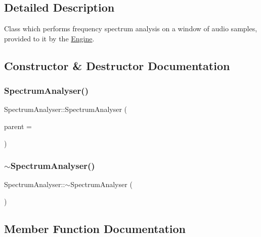 \subsection{Detailed Description}
Class which performs frequency spectrum analysis on a window of audio samples, provided to it by the \hyperlink{class_engine}{Engine}. 

\subsection{Constructor \& Destructor Documentation}
\hypertarget{class_spectrum_analyser_abf706ac78327bc590b90b586086c0cd5}{}\label{class_spectrum_analyser_abf706ac78327bc590b90b586086c0cd5} 
\subsubsection{\texorpdfstring{Spectrum\+Analyser()}{SpectrumAnalyser()}}
{\footnotesize\ttfamily Spectrum\+Analyser\+::\+Spectrum\+Analyser (\begin{DoxyParamCaption}\item[{Q\+Object $\ast$}]{parent = {} }\end{DoxyParamCaption})}

\hypertarget{class_spectrum_analyser_a3737f48dd1d95b09aeeaf3e1f081591e}{}\label{class_spectrum_analyser_a3737f48dd1d95b09aeeaf3e1f081591e} 
\subsubsection{\texorpdfstring{$\sim$\+Spectrum\+Analyser()}{~SpectrumAnalyser()}}
{\footnotesize\ttfamily Spectrum\+Analyser\+::$\sim$\+Spectrum\+Analyser (\begin{DoxyParamCaption}{ }\end{DoxyParamCaption})}



\subsection{Member Function Documentation}
\hypertarget{class_spectrum_analyser_aecd698124fcdd83760b9e808f003e1a6}{}\label{class_spectrum_analyser_aecd698124fcdd83760b9e808f003e1a6} 
